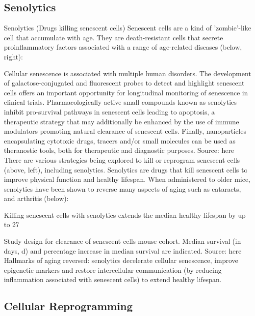 \subsection{Senolytics}

\begin{frame}[c]{Senolytics (Drugs killing senescent cells)}
    Senescent cells are a kind of 'zombie'-like cell that accumulate with age. They are death-resistant cells that secrete proinflammatory factors associated with a range of age-related diseases (below, right):  


Cellular senescence is associated with multiple human disorders. The development of galactose‐conjugated and fluorescent probes to detect and highlight senescent cells offers an important opportunity for longitudinal monitoring of senescence in clinical trials. Pharmacologically active small compounds known as senolytics inhibit pro‐survival pathways in senescent cells leading to apoptosis, a therapeutic strategy that may additionally be enhanced by the use of immune modulators promoting natural clearance of senescent cells. Finally, nanoparticles encapsulating cytotoxic drugs, tracers and/or small molecules can be used as theranostic tools, both for therapeutic and diagnostic purposes. Source: here 
There are various strategies being explored to kill or reprogram senescent cells (above, left), including senolytics. Senolytics are drugs that kill senescent cells to improve physical function and healthy lifespan. When administered to older mice, senolytics have been shown to reverse many aspects of aging such as cataracts, and arthritis (below): 


Killing senescent cells with senolytics extends the median healthy lifespan by up to 27%


Study design for clearance of senescent cells mouse cohort. Median survival (in days, d) and percentage increase in median survival are indicated. Source: here
Hallmarks of aging reversed: senolytics decelerate cellular senescence, improve epigenetic markers and restore intercellular communication (by reducing inflammation associated with senescent cells) to extend healthy lifespan. 
\end{frame}


\subsection{Cellular Reprogramming}

